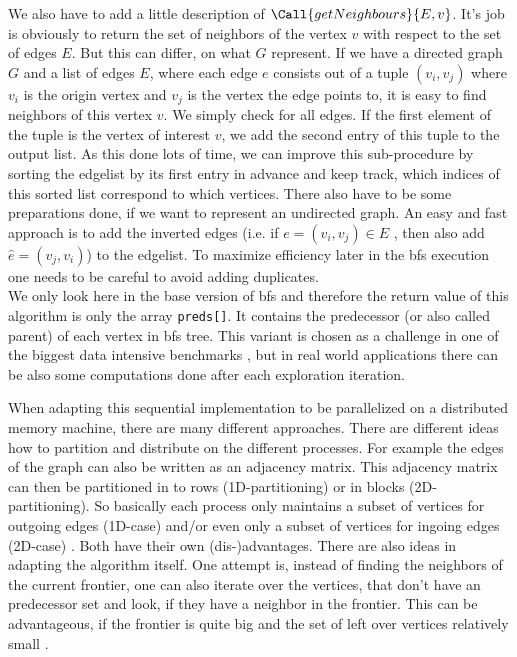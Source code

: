 We also have to add a little description of $\Call{getNeighbours}{E, v}$. It's job is obviously to return the set of neighbors of the vertex $v$ with respect to the set of edges $E$. But this can differ, on what $G$ represent. If we have a directed graph $G$ and a list of edges $E$, where each edge $e$ consists out of a tuple $(v_i, v_j)$ where $v_i$ is the origin vertex and $v_j$ is the vertex the edge points to, it is easy to find neighbors of this vertex $v$. We simply check for all edges.
If the first element of the tuple is the vertex of interest $v$, we add the second entry of this tuple to the output list. As this done lots of time, we can improve this sub-procedure by sorting the edgelist by its first entry in advance and keep track, which indices of this sorted list correspond to which vertices.
There also have to be some preparations done, if we want to represent an undirected graph. An easy and fast approach is to add the inverted edges (i.e. if $e=(v_i, v_j)\in E$ , then also add $\hat{e}=(v_j, v_i)$) to the edgelist.
To maximize efficiency later in the \ac{bfs} execution one needs to be careful to avoid adding duplicates.\\
We only look here in the base version of \ac{bfs} and therefore the return value of this algorithm is only the array \texttt{preds[]}. It contains the predecessor (or also called parent) of each vertex in \ac{bfs} tree. This variant is chosen as a challenge in one of the biggest data intensive benchmarks \cite{graph500}, but in real world applications there can be also some computations done after each exploration iteration. 

When adapting this sequential implementation to be parallelized on a distributed memory machine, there are many different approaches. There are different ideas how to partition and distribute on the different processes. For example the edges of the graph can also be written as an adjacency matrix. This adjacency matrix can then be partitioned in to rows (1D-partitioning) or in blocks (2D-partitioning).
So basically each process only maintains a subset of vertices for outgoing edges (1D-case) and/or even only a subset of vertices for ingoing edges (2D-case) \cite{graphPartitioning}. Both have their own (dis-)advantages. There are also ideas in adapting the algorithm itself.
One attempt is, instead of finding the neighbors of the current frontier, one can also iterate over the vertices, that don't have an predecessor set and look, if they have a neighbor in the frontier.
This can be advantageous, if the frontier is quite big and the set of left over vertices relatively small \cite{bottomUp}. 


